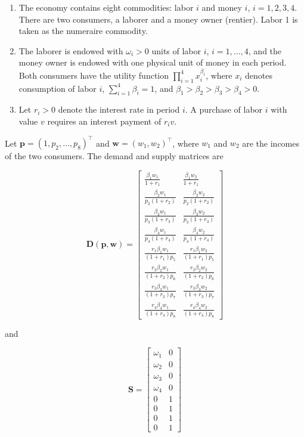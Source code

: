 \documentclass[
  letterpaper,
  DIV=11,
  numbers=noendperiod]{scrreprt}
\begin{document}
\begin{enumerate}
\def\labelenumi{\arabic{enumi}.}
\item
  The economy contains eight commodities: labor \(i\) and money \(i\),
  \(i=1,2,3,4\). There are two consumers, a laborer and a money owner
  (rentier). Labor 1 is taken as the numeraire commodity.
\item
  The laborer is endowed with \(\omega_i>0\) units of labor \(i\),
  \(i=1,\ldots,4\), and the money owner is endowed with one physical
  unit of money in each period. Both consumers have the utility function
  \(\prod_{i=1}^4x_i^{\beta_i}\), where \(x_i\) denotes consumption of
  labor \(i\), \(\sum_{i=1}^4\beta_i=1\), and
  \(\beta_1>\beta_2>\beta_3>\beta_4>0\).
\item
  Let \(r_i>0\) denote the interest rate in period \(i\). A purchase of
  labor \(i\) with value \(v\) requires an interest payment of
  \(r_i v\).
\end{enumerate}

Let \(\mathbf p=(1,p_2,\ldots,p_8)^\top\) and
\(\mathbf w=(w_1,w_2)^\top\), where \(w_1\) and \(w_2\) are the incomes
of the two consumers. The demand and supply matrices are

\[
\mathbf D(\mathbf p,\mathbf w)
=
\begin{bmatrix}
\frac{\beta_1w_1}{1+r_1}
&
\frac{\beta_1w_2}{1+r_1}
\\
\frac{\beta_2w_1}{p_2(1+r_2)}
&
\frac{\beta_2w_2}{p_2(1+r_2)}
\\
\frac{\beta_3w_1}{p_3(1+r_3)}
&
\frac{\beta_3w_2}{p_3(1+r_3)}
\\
\frac{\beta_4w_1}{p_4(1+r_4)}
&
\frac{\beta_4w_2}{p_4(1+r_4)}
\\
\frac{r_1\beta_1w_1}{(1+r_1)p_5}
&
\frac{r_1\beta_1w_2}{(1+r_1)p_5}
\\
\frac{r_2\beta_2w_1}{(1+r_2)p_6}
&
\frac{r_2\beta_2w_2}{(1+r_2)p_6}
\\
\frac{r_3\beta_3w_1}{(1+r_3)p_7}
&
\frac{r_3\beta_3w_2}{(1+r_3)p_7}
\\
\frac{r_4\beta_4w_1}{(1+r_4)p_8}
&
\frac{r_4\beta_4w_2}{(1+r_4)p_8}
\end{bmatrix}
\]

and

\[
\mathbf S
=
\begin{bmatrix}
\omega_1&0\\
\omega_2&0\\
\omega_3&0\\
\omega_4&0\\
0&1\\
0&1\\
0&1\\
0&1
\end{bmatrix}
\]
\end{document}
